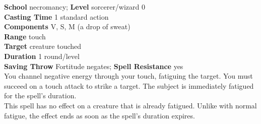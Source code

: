 \textbf{School} necromancy; \textbf{Level} sorcerer/wizard 0\\
\textbf{Casting Time} 1 standard action\\
\textbf{Components} V, S, M (a drop of sweat)\\
\textbf{Range} touch\\
\textbf{Target} creature touched\\
\textbf{Duration} 1 round/level\\
\textbf{Saving Throw} Fortitude negates; \textbf{Spell Resistance} yes\\
You channel negative energy through your touch, fatiguing the target. You must succeed on a touch attack to strike a target. The subject is immediately fatigued for the spell's duration.\\
This spell has no effect on a creature that is already fatigued. Unlike with normal fatigue, the effect ends as soon as the spell's duration expires.\\

